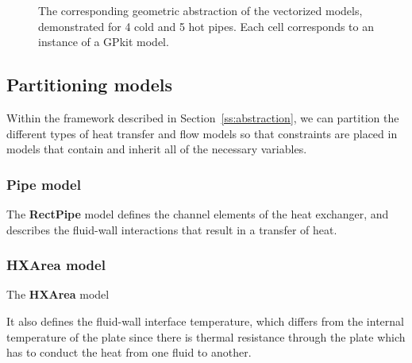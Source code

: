 \documentclass{article}
\begin{document}
\begin{center}
\begin{figure}
\centering
{}
\caption{\textnormal{The corresponding geometric abstraction of the vectorized models, demonstrated for 4 cold and 5 hot pipes. Each cell corresponds to an instance of a GPkit model.}}
\end{figure}
\end{center}

\subsection{Partitioning models}

Within the framework described in Section~\ref{ss:abstraction}, we can partition the different types of heat transfer and flow models so that constraints are placed in models that contain and inherit all of the necessary variables. 

\subsubsection{\textbf{Pipe} model}

The \textbf{RectPipe} model defines the channel elements of the heat exchanger, and describes the fluid-wall interactions that result in a transfer of heat. 

\subsubsection{\textbf{HXArea} model}

The \textbf{HXArea} model 

It also defines the fluid-wall interface temperature, which differs from the internal temperature of the plate since there is thermal resistance through the plate which has to conduct the heat from one fluid to another. 
\end{document}
